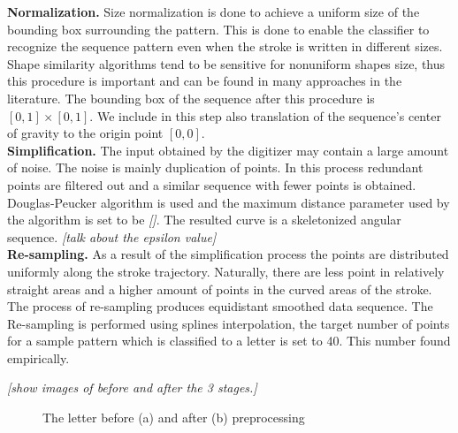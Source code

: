 \documentclass[journal,compsoc]{IEEEtran}
\begin{document}
\textbf{Normalization.} Size normalization is done to achieve a uniform size of the bounding box surrounding the pattern. This is done to enable the classifier to recognize the sequence pattern even when the stroke is written in different sizes. Shape similarity algorithms tend to be sensitive for nonuniform shapes size, thus this procedure is important and can be found in many approaches in the literature. The bounding box of the sequence after this procedure is $[0,1]\times[0,1]$. We include in this step also translation of the sequence's center of gravity to the origin point $[0,0]$.\\

\textbf{Simplification.} The input obtained by the digitizer may contain a large amount of noise. The noise is mainly duplication of points. In this process redundant points are filtered out and a similar sequence with fewer points is obtained. Douglas-Peucker algorithm is used and the maximum distance parameter used by the algorithm is set to be \emph{[]}. The resulted curve is a skeletonized angular sequence. \emph{[talk about the epsilon value]}\\

\textbf{Re-sampling.} As a result of the simplification process the points are distributed uniformly along the stroke trajectory. Naturally, there are less point in relatively straight areas and a higher amount of points in the curved areas of the stroke. The process of re-sampling produces equidistant smoothed data sequence. The Re-sampling is performed using splines interpolation, the target number of points for a sample pattern which is classified to a letter is set to 40. This number found empirically.

\emph{[show images of before and after the 3 stages.]}
 
\begin{figure}
	\centering
    \caption{The letter  before (a) and after (b) preprocessing}
   \label{fig:D_before_after_preprocessing}
\end{figure}
\end{document}
